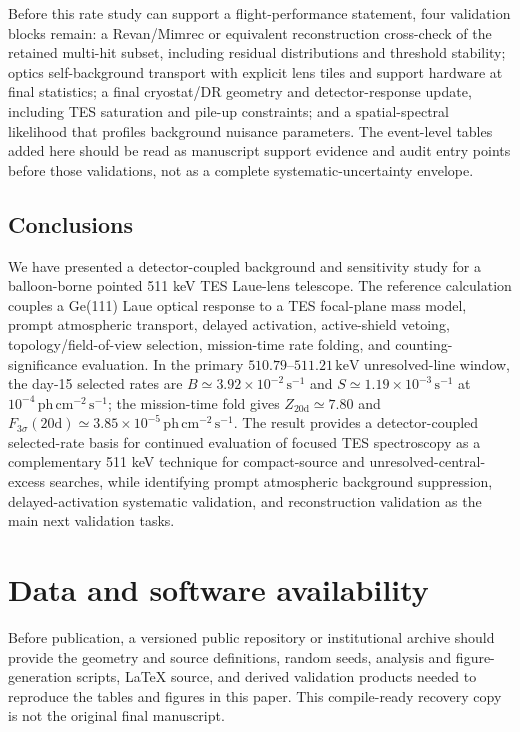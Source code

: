 \documentclass[11pt]{article}
\newcommand{\keV}{\ensuremath{\,\mathrm{keV}}}
\newcommand{\phcms}{\ensuremath{\,\mathrm{ph\,cm^{-2}\,s^{-1}}}}
\newcommand{\cps}{\ensuremath{\,\mathrm{s^{-1}}}}
\newcommand{\fthree}{F_{3\sigma}}
\newcommand{\rewritten}[1]{{\color{green!45!black}#1}}
\begin{document}
\rewritten{Before this rate study can support a flight-performance statement, four validation blocks remain: a Revan/Mimrec or equivalent reconstruction cross-check of the retained multi-hit subset, including residual distributions and threshold stability; optics self-background transport with explicit lens tiles and support hardware at final statistics; a final cryostat/DR geometry and detector-response update, including TES saturation and pile-up constraints; and a spatial-spectral likelihood that profiles background nuisance parameters. The event-level tables added here should be read as manuscript support evidence and audit entry points before those validations, not as a complete systematic-uncertainty envelope.}

\subsection{Conclusions}
\label{sec:conclusions}

We have presented a detector-coupled background and sensitivity study for a balloon-borne pointed 511 keV TES Laue-lens telescope. The reference calculation couples a Ge(111) Laue optical response to a TES focal-plane mass model, prompt atmospheric transport, delayed activation, active-shield vetoing, topology/field-of-view selection, mission-time rate folding, and counting-significance evaluation. In the primary $510.79$--$511.21\keV$ unresolved-line window, the day-15 selected rates are $B\simeq3.92\times10^{-2}\cps$ and $S\simeq1.19\times10^{-3}\cps$ at $10^{-4}\phcms$; the mission-time fold gives $Z_{20\mathrm{d}}\simeq7.80$ and $\fthree(20\mathrm{d})\simeq3.85\times10^{-5}\phcms$. The result provides a detector-coupled selected-rate basis for continued evaluation of focused TES spectroscopy as a complementary 511 keV technique for compact-source and unresolved-central-excess searches, while identifying prompt atmospheric background suppression, delayed-activation systematic validation, and reconstruction validation as the main next validation tasks.

\section*{Data and software availability}
Before publication, a versioned public repository or institutional archive should provide the geometry and source definitions, random seeds, analysis and figure-generation scripts, LaTeX source, and derived validation products needed to reproduce the tables and figures in this paper. This compile-ready recovery copy is not the original final manuscript.
\end{document}
